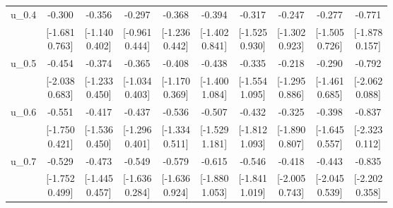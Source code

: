 {\begin{tabular}{lccccccccc}
u\_0.4 & -0.300 & -0.356 & -0.297 & -0.368 & -0.394 & -0.317 & -0.247 & -0.277 & -0.771 \\
 & \shortstack{[-1.681\\0.763]} & \shortstack{[-1.140\\0.402]} & \shortstack{[-0.961\\0.444]} & \shortstack{[-1.236\\0.442]} & \shortstack{[-1.402\\0.841]} & \shortstack{[-1.525\\0.930]} & \shortstack{[-1.302\\0.923]} & \shortstack{[-1.505\\0.726]} & \shortstack{[-1.878\\0.157]} \\[0.25em]
u\_0.5 & -0.454 & -0.374 & -0.365 & -0.408 & -0.438 & -0.335 & -0.218 & -0.290 & -0.792 \\
 & \shortstack{[-2.038\\0.683]} & \shortstack{[-1.233\\0.450]} & \shortstack{[-1.034\\0.403]} & \shortstack{[-1.170\\0.369]} & \shortstack{[-1.400\\1.084]} & \shortstack{[-1.554\\1.095]} & \shortstack{[-1.295\\0.886]} & \shortstack{[-1.461\\0.685]} & \shortstack{[-2.062\\0.088]} \\[0.25em]
u\_0.6 & -0.551 & -0.417 & -0.437 & -0.536 & -0.507 & -0.432 & -0.325 & -0.398 & -0.837 \\
 & \shortstack{[-1.750\\0.421]} & \shortstack{[-1.536\\0.450]} & \shortstack{[-1.296\\0.401]} & \shortstack{[-1.334\\0.511]} & \shortstack{[-1.529\\1.181]} & \shortstack{[-1.812\\1.093]} & \shortstack{[-1.890\\0.807]} & \shortstack{[-1.645\\0.557]} & \shortstack{[-2.323\\0.112]} \\[0.25em]
u\_0.7 & -0.529 & -0.473 & -0.549 & -0.579 & -0.615 & -0.546 & -0.418 & -0.443 & -0.835 \\
 & \shortstack{[-1.752\\0.499]} & \shortstack{[-1.445\\0.457]} & \shortstack{[-1.636\\0.284]} & \shortstack{[-1.636\\0.924]} & \shortstack{[-1.880\\1.053]} & \shortstack{[-1.841\\1.019]} & \shortstack{[-2.005\\0.743]} & \shortstack{[-2.045\\0.539]} & \shortstack{[-2.202\\0.358]} \\[0.25em]

\end{tabular}}
